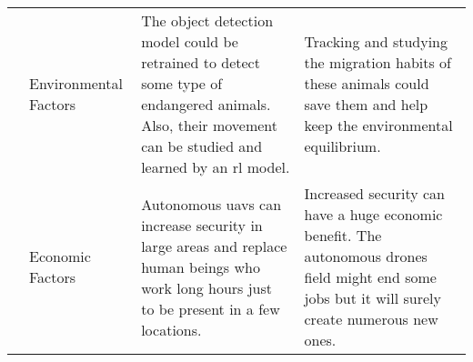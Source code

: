 \documentclass[../main.tex]{subfiles}
\begin{document}
\begin{table}[H]
\begin{tabularx}{\textwidth}{ c p{2.5cm} X X }
	\showimpactcounter
	& Environmental Factors
	& The object detection model could be retrained to detect some 
	type of endangered animals. Also, their movement can be studied and 
	learned by an \gls{rl} model. 
	& Tracking and studying the migration habits of these animals could save 
	them and help keep the environmental equilibrium.  \\
	
	\showimpactcounter
	& Economic Factors  
	& Autonomous \glspl{uav} can increase security in large areas and replace 
	human beings who work long hours just to be present in a few locations. 
	& Increased security can have a huge economic benefit. The autonomous 
	drones field might end some jobs but it will surely create numerous new 
	ones.\\     
	
	\bottomrule		
\end{tabularx}
\end{table}

\end{document}

